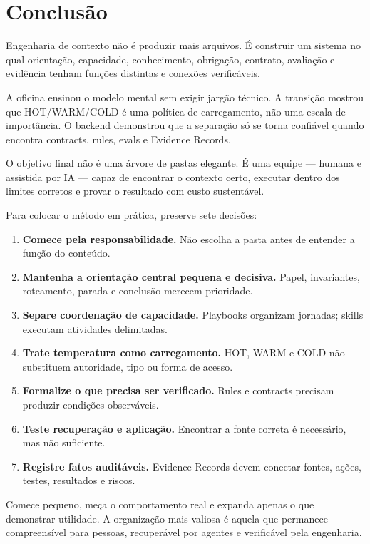 \documentclass[
  10pt,
  a4paper,
  oneside]{book}
\providecommand{\tightlist}{%
  \setlength{\itemsep}{0pt}\setlength{\parskip}{0pt}}
\begin{document}
\normalsize

\hypertarget{conclusuxe3o}{%
\chapter{Conclusão}\label{conclusuxe3o}}

Engenharia de contexto não é produzir mais arquivos. É construir um
sistema no qual orientação, capacidade, conhecimento, obrigação,
contrato, avaliação e evidência tenham funções distintas e conexões
verificáveis.

A oficina ensinou o modelo mental sem exigir jargão técnico. A transição
mostrou que HOT/WARM/COLD é uma política de carregamento, não uma escala
de importância. O backend demonstrou que a separação só se torna
confiável quando encontra contracts, rules, evals e Evidence Records.

O objetivo final não é uma árvore de pastas elegante. É uma equipe ---
humana e assistida por IA --- capaz de encontrar o contexto certo,
executar dentro dos limites corretos e provar o resultado com custo
sustentável.

Para colocar o método em prática, preserve sete decisões:

\begin{enumerate}
\def\labelenumi{\arabic{enumi}.}
\tightlist
\item
  \textbf{Comece pela responsabilidade.} Não escolha a pasta antes de
  entender a função do conteúdo.
\item
  \textbf{Mantenha a orientação central pequena e decisiva.} Papel,
  invariantes, roteamento, parada e conclusão merecem prioridade.
\item
  \textbf{Separe coordenação de capacidade.} Playbooks organizam
  jornadas; skills executam atividades delimitadas.
\item
  \textbf{Trate temperatura como carregamento.} HOT, WARM e COLD não
  substituem autoridade, tipo ou forma de acesso.
\item
  \textbf{Formalize o que precisa ser verificado.} Rules e contracts
  precisam produzir condições observáveis.
\item
  \textbf{Teste recuperação e aplicação.} Encontrar a fonte correta é
  necessário, mas não suficiente.
\item
  \textbf{Registre fatos auditáveis.} Evidence Records devem conectar
  fontes, ações, testes, resultados e riscos.
\end{enumerate}

Comece pequeno, meça o comportamento real e expanda apenas o que
demonstrar utilidade. A organização mais valiosa é aquela que permanece
compreensível para pessoas, recuperável por agentes e verificável pela
engenharia.
\end{document}
